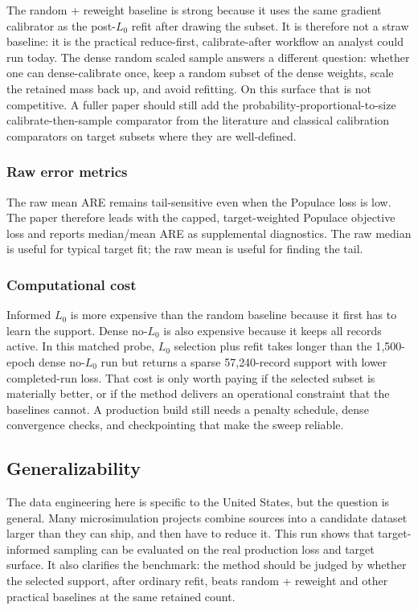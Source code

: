 The random + reweight baseline is strong because it uses the same gradient calibrator as the post-$L_0$
refit after drawing the subset. It is therefore not a straw baseline: it is the practical reduce-first,
calibrate-after workflow an analyst could run today. The dense random scaled sample answers a different
question: whether one can dense-calibrate once, keep a random subset of the dense weights, scale the
retained mass back up, and avoid refitting. On this surface that is not competitive. A fuller paper should
still add the probability-proportional-to-size calibrate-then-sample comparator from the literature and
classical calibration comparators on target subsets where they are well-defined.

\subsubsection{Raw error metrics}

The raw mean ARE remains tail-sensitive even when the Populace loss is low. The paper therefore leads with
the capped, target-weighted Populace objective loss and reports median/mean ARE as supplemental
diagnostics. The raw median is useful for typical target fit; the raw mean is useful for finding the tail.

\subsubsection{Computational cost}

Informed $L_0$ is more expensive than the random baseline because it first has to learn the support. Dense
no-$L_0$ is also expensive because it keeps all records active. In this matched probe, $L_0$ selection plus
refit takes longer than the 1{,}500-epoch dense no-$L_0$ run but returns a sparse 57{,}240-record support
with lower completed-run loss. That cost is only worth paying if the selected subset is materially better,
or if the method delivers an operational constraint that the baselines cannot. A production build still
needs a penalty schedule, dense convergence checks, and checkpointing that make the sweep reliable.

\subsection{Generalizability}

The data engineering here is specific to the United States, but the question is general. Many
microsimulation projects combine sources into a candidate dataset larger than they can ship, and then have
to reduce it. This run shows that target-informed sampling can be evaluated on the real production loss and
target surface. It also clarifies the benchmark: the method should be judged by whether the selected
support, after ordinary refit, beats random + reweight and other practical baselines at the same retained
count.
